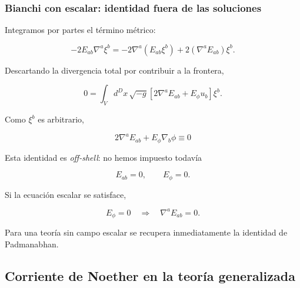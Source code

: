 \documentclass{beamer}
\newcommand{\CompactDisplaySpacing}{%
  \setlength{\abovedisplayskip}{2pt plus 1pt minus 1pt}%
  \setlength{\belowdisplayskip}{2pt plus 1pt minus 1pt}%
  \setlength{\abovedisplayshortskip}{0pt plus 1pt}%
  \setlength{\belowdisplayshortskip}{1pt plus 1pt}%
}
\begin{document}
\begin{frame}[label=nav-frame-081]
	\frametitle{Bianchi con escalar: identidad fuera de las soluciones}
\linespread{.96}\selectfont\CompactDisplaySpacing
	\small
	\CompactDisplaySpacing

	Integramos por partes el término métrico:

	\[
	-2E_{ab}\nabla^a\xi^b
	=
	-2\nabla^a(E_{ab}\xi^b)
	+
	2(\nabla^aE_{ab})\xi^b.
	\]

	Descartando la divergencia total por contribuir a la frontera,

	\[
	0
	=
	\int_V d^Dx\,\sqrt{-g}
	\left[
	2\nabla^aE_{ab}
	+
	E_\phi u_b
	\right]\xi^b.
	\]


	Como $\xi^b$ es arbitrario,

	\begin{equation}
		\boxed{
			2\nabla^aE_{ab}
			+
			E_\phi\nabla_b\phi
			\equiv0
		}
		\label{eq:Bianchi-generalizada-escalar}
	\end{equation}


	Esta identidad es \emph{off-shell}: no hemos impuesto todavía

	\[
	E_{ab}=0,
	\qquad
	E_\phi=0.
	\]

	Si la ecuación escalar se satisface,

	\[
	E_\phi=0
	\quad\Longrightarrow\quad
	\nabla^aE_{ab}=0.
	\]

	Para una teoría sin campo escalar se recupera inmediatamente
	la identidad de Padmanabhan.

\end{frame}




\subsection{Corriente de Noether en la teoría generalizada}
\end{document}
